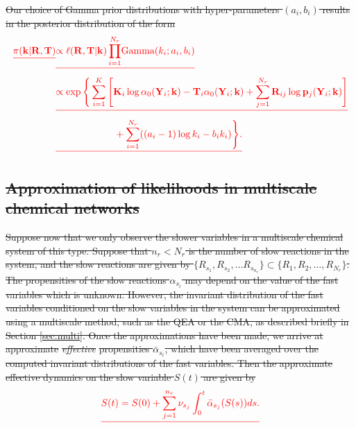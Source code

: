\documentclass[final]{siamltex}
\providecommand{\DIFdel}[1]{{\protect\color{red}\sout{#1}}}                      %
\begin{document}
\DIFdel{Our choice of Gamma prior distributions with hyper-parameters $(a_i, b_i)$ results in the posterior distribution of the form
}\begin{align*}
	\DIFdel{\pi(\mathbf{k}|\mathbf{R}, \mathbf{T}) }&\DIFdel{\propto \ell(\mathbf{R}, \mathbf{T}|\mathbf{k})
	\prod_{i=1}^{N_r} \! \text{Gamma}(k_i; a_i, b_i) \notag }\\
		&\DIFdel{\propto \exp\Bigg\{\sum\limits_{i=1}^K \Bigg[
				\mathbf{K}_i\log \alpha_0(\mathbf{Y}_i; \mathbf{k}) - \mathbf{T}_i\alpha_0(\mathbf{Y}_i; \mathbf{k}) %
				+\sum_{j=1}^{N_r} \mathbf{R}_{ij}\log\mathbf{p}_j(\mathbf{Y}_i; \mathbf{k})
			\Bigg]  \notag}\\
		&	\DIFdel{\qquad\qquad\qquad{} + \sum_{i=1}^{N_r} ((a_i-1)\log k_i - b_ik_i)\Bigg\}. \label{eqn:chem_posterior}
}\end{align*}

\subsection{\DIFdel{Approximation of likelihoods in multiscale chemical
  networks}}
\addtocounter{subsection}{-1}%
\DIFdel{Suppose now that we only observe the slower variables in a
multiscale chemical system of this type. Suppose that $n_r < N_r$ is the number of slow
reactions in the system, and the slow reactions are given by $\{R_{s_1},
R_{s_2}, \ldots R_{s_{n_r}} \} \subset \{R_1, R_2, \ldots , R_{N_r}
\}$. The propensities of the slow
reactions $\alpha_{s_i}$ may depend on the value of the fast variables which is
unknown. However, the invariant distribution of the fast variables
conditioned on the slow variables in the system can be approximated
using a multiscale method, such as the QEA or the CMA, as described
briefly in Section \ref{sec:multi}. Once the approximations have been
made, we arrive at approximate }\emph{\DIFdel{effective}} %
\DIFdel{propensities $\bar{\alpha}_{s_i}$, which
have been averaged over the computed invariant distributions of the
fast variables. Then the approximate effective dynamics on the slow variable $S(t)$ are given by 
}\begin{displaymath}\DIFdel{%

S(t) = S(0) + \sum_{j=1}^{n_r} \nu_{s_j} \int_0^t \bar{\alpha}_{s_j}(S(s)) ds.
}\end{displaymath}
\end{document}
